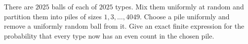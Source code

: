 There are $2025$ balls of each of $2025$ types. Mix them uniformly at random and partition them into piles of sizes $1,3,\ldots,4049$. Choose a pile uniformly and remove a uniformly random ball from it. Give an exact finite expression for the probability that every type now has an even count in the chosen pile.
